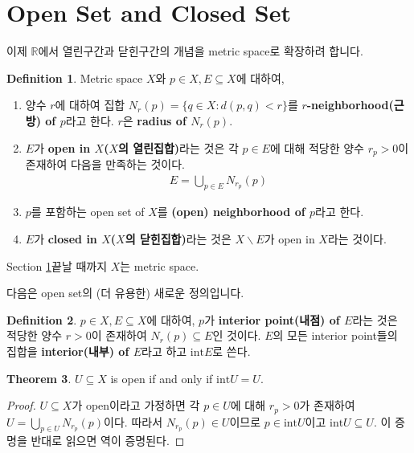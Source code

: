 \documentclass[12pt]{article}
\theoremstyle{definition}
\newtheorem{thm}{Theorem}[section]
\newtheorem{defn}[thm]{Definition}
\begin{document}
\section{Open Set and Closed Set} \label{sec open}


이제 \(\mathbb{R}\)에서 열린구간과 닫힌구간의 개념을 metric space로 확장하려 합니다. 

	\begin{defn} \label{def metric top}
		Metric space \(X\)와 \(p \in X, E \subseteq X\)에 대하여,
		\begin{enumerate}[label=(\alph*), leftmargin=2\parindent]
			\item
			양수 \(r\)에 대하여 집합 \(N_r (p) = \{q \in X : d(p, q) < r\}\)를 \textbf{\(r\)-neighborhood(근방) of \(p\)}라고 한다. \(r\)은 \textbf{radius of \(N_r (p)\)}.
			\item
			\(E\)가 \textbf{open in \(X\)(\(X\)의 열린집합)}라는 것은 각 \(p \in E\)에 대해 적당한 양수 \(r_p > 0\)이 존재하여 다음을 만족하는 것이다.
			\begin{gather*}
				E = \bigcup_{p \in E} N_{r_p}(p)
			\end{gather*}
			\item
			\(p\)를 포함하는 open set of \(X\)를 \textbf{(open) neighborhood of \(p\)}라고 한다.
			\item
			\(E\)가 \textbf{closed in \(X\)(\(X\)의 닫힌집합)}라는 것은 \(X \backslash E\)가 open in \(X\)라는 것이다.
		\end{enumerate}
		
	\end{defn}

Section \ref{sec open}\이 끝날 때까지 \(X\)는 metric space.

다음은 open set의 (더 유용한) 새로운 정의입니다.

	\begin{defn}
		\(p \in X, E \subseteq X\)에 대하여, \(p\)가 \textbf{interior point(내점) of \(E\)}라는 것은 적당한 양수 \(r > 0\)이 존재하여 \(N_r (p) \subseteq E\)인 것이다. \(E\)의 모든 interior point들의 집합을 \textbf{interior(내부) of \(E\)}라고 하고 \(\text{int}E\)로 쓴다.
	\end{defn}

	\begin{thm}
		\(U \subseteq X\) is open if and only if \(\text{int}U = U\).
	\end{thm}
	\begin{proof}
		\(U \subseteq X\)가 open이라고 가정하면 각 \(p \in U\)에 대해 \(r_p > 0\)가 존재하여 \(U = \bigcup_{p \in U} N_{r_p}(p)\)이다. 따라서 \(N_{r_p}(p) \in U\)이므로 \(p \in \text{int}U\)이고 \(\text{int}U \subseteq U\). 이 증명을 반대로 읽으면 역이 증명된다.
	\end{proof}
\end{document}
